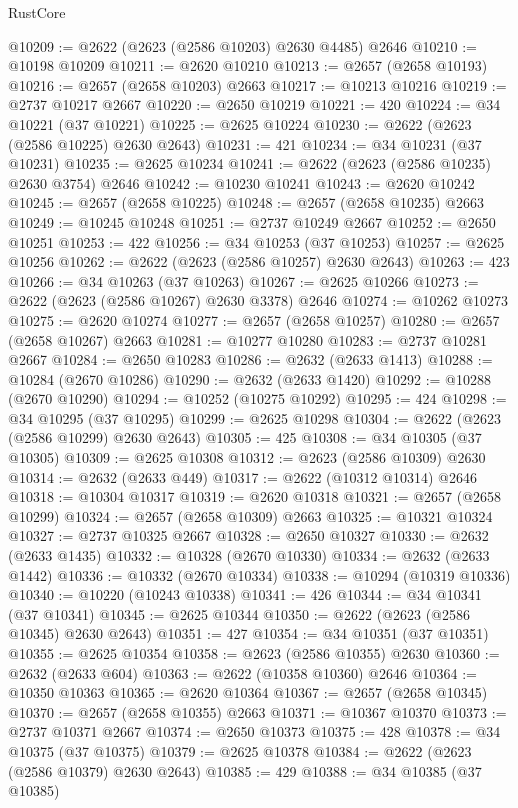 \begin{lexlean}{RustCore}
\begin{coremodule}
@10209 := @2622 (@2623 (@2586 @10203) @2630 @4485) @2646
@10210 := @10198 @10209
@10211 := @2620 @10210
@10213 := @2657 (@2658 @10193)
@10216 := @2657 (@2658 @10203) @2663
@10217 := @10213 @10216
@10219 := @2737 @10217 @2667
@10220 := @2650 @10219
@10221 := 420
@10224 := @34 @10221 (@37 @10221)
@10225 := @2625 @10224
@10230 := @2622 (@2623 (@2586 @10225) @2630 @2643)
@10231 := 421
@10234 := @34 @10231 (@37 @10231)
@10235 := @2625 @10234
@10241 := @2622 (@2623 (@2586 @10235) @2630 @3754) @2646
@10242 := @10230 @10241
@10243 := @2620 @10242
@10245 := @2657 (@2658 @10225)
@10248 := @2657 (@2658 @10235) @2663
@10249 := @10245 @10248
@10251 := @2737 @10249 @2667
@10252 := @2650 @10251
@10253 := 422
@10256 := @34 @10253 (@37 @10253)
@10257 := @2625 @10256
@10262 := @2622 (@2623 (@2586 @10257) @2630 @2643)
@10263 := 423
@10266 := @34 @10263 (@37 @10263)
@10267 := @2625 @10266
@10273 := @2622 (@2623 (@2586 @10267) @2630 @3378) @2646
@10274 := @10262 @10273
@10275 := @2620 @10274
@10277 := @2657 (@2658 @10257)
@10280 := @2657 (@2658 @10267) @2663
@10281 := @10277 @10280
@10283 := @2737 @10281 @2667
@10284 := @2650 @10283
@10286 := @2632 (@2633 @1413)
@10288 := @10284 (@2670 @10286)
@10290 := @2632 (@2633 @1420)
@10292 := @10288 (@2670 @10290)
@10294 := @10252 (@10275 @10292)
@10295 := 424
@10298 := @34 @10295 (@37 @10295)
@10299 := @2625 @10298
@10304 := @2622 (@2623 (@2586 @10299) @2630 @2643)
@10305 := 425
@10308 := @34 @10305 (@37 @10305)
@10309 := @2625 @10308
@10312 := @2623 (@2586 @10309) @2630
@10314 := @2632 (@2633 @449)
@10317 := @2622 (@10312 @10314) @2646
@10318 := @10304 @10317
@10319 := @2620 @10318
@10321 := @2657 (@2658 @10299)
@10324 := @2657 (@2658 @10309) @2663
@10325 := @10321 @10324
@10327 := @2737 @10325 @2667
@10328 := @2650 @10327
@10330 := @2632 (@2633 @1435)
@10332 := @10328 (@2670 @10330)
@10334 := @2632 (@2633 @1442)
@10336 := @10332 (@2670 @10334)
@10338 := @10294 (@10319 @10336)
@10340 := @10220 (@10243 @10338)
@10341 := 426
@10344 := @34 @10341 (@37 @10341)
@10345 := @2625 @10344
@10350 := @2622 (@2623 (@2586 @10345) @2630 @2643)
@10351 := 427
@10354 := @34 @10351 (@37 @10351)
@10355 := @2625 @10354
@10358 := @2623 (@2586 @10355) @2630
@10360 := @2632 (@2633 @604)
@10363 := @2622 (@10358 @10360) @2646
@10364 := @10350 @10363
@10365 := @2620 @10364
@10367 := @2657 (@2658 @10345)
@10370 := @2657 (@2658 @10355) @2663
@10371 := @10367 @10370
@10373 := @2737 @10371 @2667
@10374 := @2650 @10373
@10375 := 428
@10378 := @34 @10375 (@37 @10375)
@10379 := @2625 @10378
@10384 := @2622 (@2623 (@2586 @10379) @2630 @2643)
@10385 := 429
@10388 := @34 @10385 (@37 @10385)

\end{coremodule}
\end{lexlean}
